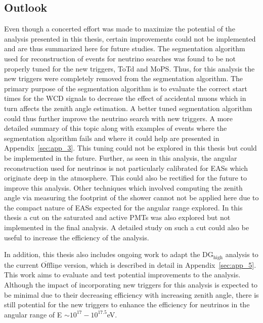 \subsection*{Outlook}
Even though a concerted effort was made to maximize the potential of the analysis presented in this thesis, certain improvements could not be implemented and are thus summarized here for future studies. The segmentation algorithm used for reconstruction of events for neutrino searches was found to be not properly tuned for the new triggers, ToTd and MoPS. Thus, for this analysis the new triggers were completely removed from the segmentation algorithm. The primary purpose of the segmentation algorithm is to evaluate the correct start times for the WCD signals to decrease the effect of accidental muons which in turn affects the zenith angle estimation. A better tuned segmentation algorithm could thus further improve the neutrino search with new triggers. A more detailed summary of this topic along with examples of events where the segmentation algorithm fails and where it could help are presented in Appendix~\ref{sec:app_3}. This tuning could not be explored in this thesis but could be implemented in the future. Further, as seen in this analysis, the angular reconstruction used for neutrinos is not particularly calibrated for EASs which originate deep in the atmosphere. This could also be rectified for the future to improve this analysis. Other techniques which involved computing the zenith angle via measuring the footprint of the shower cannot not be applied here due to the compact nature of EASs expected for the angular range explored. In this thesis a cut on the saturated and active PMTs was also explored but not implemented in the final analysis. A detailed study on such a cut could also be useful to increase the efficiency of the analysis. 

In addition, this thesis also includes ongoing work to adapt the DG$\mathrm{_{high}}$ analysis to the current $\mathrm{\overline{Off} \underline{line}}$ version, which is described in detail in Appendix~\ref{sec:app_5}. This work aims to evaluate and test potential improvements to the analysis. Although the impact of incorporating new triggers for this analysis is expected to be minimal due to their decreasing efficiency with increasing zenith angle, there is still potential for the new triggers to enhance the efficiency for neutrinos in the angular range of E $\sim 10^{17}-10^{17.5}$eV.

